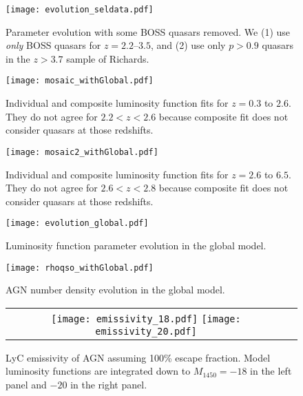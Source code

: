 \documentclass[a4paper,fleqn,usenatbib]{mnras}
\begin{document}
\begin{figure*}
  \begin{center}
    \texttt{[image: evolution\_seldata.pdf]}
  \end{center}
  \caption{Parameter evolution with some BOSS quasars removed.  We (1)
    use \emph{only} BOSS quasars for $z=2.2$--$3.5$, and (2) use only
    $p>0.9$ quasars in the $z>3.7$ sample of Richards.}
\end{figure*}

\begin{figure*}
  \begin{center}
    \texttt{[image: mosaic\_withGlobal.pdf]}
  \end{center}
  \caption{Individual and composite luminosity function fits for
    $z=0.3$ to $2.6$.  They do not agree for $2.2 < z < 2.6$ because
    composite fit does not consider quasars at those redshifts.}
  \label{fig:mosaic_withGlobal}
\end{figure*}

\begin{figure*}
  \begin{center}
    \texttt{[image: mosaic2\_withGlobal.pdf]}
  \end{center}
  \caption{Individual and composite luminosity function fits for
    $z=2.6$ to $6.5$.  They do not agree for $2.6 < z < 2.8$ because
    composite fit does not consider quasars at those redshifts.}
  \label{fig:mosaic2_withGlobal}
\end{figure*}

\begin{figure*}
  \begin{center}
    \texttt{[image: evolution\_global.pdf]}
  \end{center}
  \caption{Luminosity function parameter evolution in the global model.}
\end{figure*}

\begin{figure*}
  \begin{center}
    \texttt{[image: rhoqso\_withGlobal.pdf]}
  \end{center}
  \caption{AGN number density evolution in the global model.}
  \label{fig:rhoqso}
\end{figure*}

\begin{figure*}
  \begin{center}
    \begin{tabular}{cc}
    \texttt{[image: emissivity\_18.pdf]}
    \texttt{[image: emissivity\_20.pdf]}
    \end{tabular}
  \end{center}
  \caption{LyC emissivity of AGN assuming 100\% escape fraction.
    Model luminosity functions are integrated down to $M_{1450}=-18$
    in the left panel and $-20$ in the right panel.}
  \label{fig:emissivity}
\end{figure*}
\end{document}
